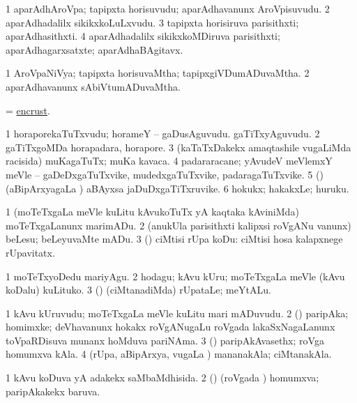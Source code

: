 \bentry
{}
\gl{\nA}
\bmng
\bnum
\num{1} aparAdhAroVpa; tapipxta horisuvudu; aparAdhavanunx AroVpisuvudu. 
\num{2} aparAdhadalilx sikikxkoLuLxvudu. 
\num{3} tapipxta horisiruva parisithxti; aparAdhasithxti. 
\num{4} aparAdhadalilx sikikxkoMDiruva parisithxti; aparAdhagarxsatxte; aparAdhaBAgitavx. 
\enum
\emng
\eentry

\bentry
{}
\gl{\gu}
\bmng
\bnum
\num{1} AroVpaNiVya; tapipxta horisuvaMtha; tapipxgiVDumADuvaMtha. 
\num{2} aparAdhavanunx sAbiVtumADuvaMtha. 
\enum
\emng
\eentry

\bentry
{}
\gl{\kirx}
\bmng
= \hyperref{kandict_e.pdf}{E}{encrust}{encrust}. 
\emng
\eentry

\bentry
{}
\gl{\nA}
\bmng
\bnum
\num{1} horaporekaTuTxvudu; horameY -- gaDusAguvudu. gaTiTxyAguvudu. 
\num{2} gaTiTxgoMDa horapadara, horapore. 
\num{3} (kaTaTxDakekx amaqtashile \mo vugaLiMda racisida) muKagaTuTx; muKa kavaca. 
\num{4} padararacane; yAvudeV meVlemxY meVle -- gaDeDxgaTuTxvike, mudedxgaTuTxvike, padaragaTuTxvike. 
\num{5} (\rUpa) (aBipArxyagaLa \vi) aBAyxsa jaDuDxgaTiTxruvike. 
\num{6} hokukx; hakakxLe; huruku. 
\enum
\emng
\eentry

\bentry
{}
\gl{\sakirx}
\bmng
\bnum
\num{1} (moTeTxgaLa meVle kuLitu kAvukoTuTx yA kaqtaka kAviniMda) moTeTxgaLanunx marimADu. 
\num{2} (anukUla parisithxti kalipxsi roVgANu \mo vanunx) beLesu; beLeyuvaMte mADu. 
\num{3} (\rUpa) ciMtisi rUpa koDu:  ciMtisi hosa kalapxnege rUpavitatx. 
\enum
\emng

\noindent
\gl{\akirx}
\bmng
\bnum
\num{1} moTeTxyoDedu mariyAgu. 
\num{2} hodagu; kAvu kUru; moTeTxgaLa meVle (kAvu koDalu) kuLituko. 
\num{3} (\rUpa) (ciMtanadiMda) rUpataLe; meYtALu. 
\enum
\emng
\eentry

\bentry
{}
\gl{\nA}
\bmng
\bnum
\num{1} kAvu kUruvudu; moTeTxgaLa meVle kuLitu mari mADuvudu. 
\num{2} (\roVshA) paripAka; homimxke; deVhavanunx hokakx roVgANugaLu roVgada lakaSxNagaLanunx toVpaRDisuva munanx hoMduva pariNAma. 
\num{3} (\roVshA) paripAkAvasethx; roVga homumxva kAla. 
\num{4} (rUpa, aBipArxya, \mo vugaLa \vi) mananakAla; ciMtanakAla. 
\enum
\emng
\eentry

\bentry
{}
\gl{\gu}
\bmng
\bnum
\num{1} kAvu koDuva yA adakekx saMbaMdhisida. 
\num{2} (\roVshA) (roVgada \vi) homumxva; paripAkakekx baruva. 
\enum
\emng
\eentry

